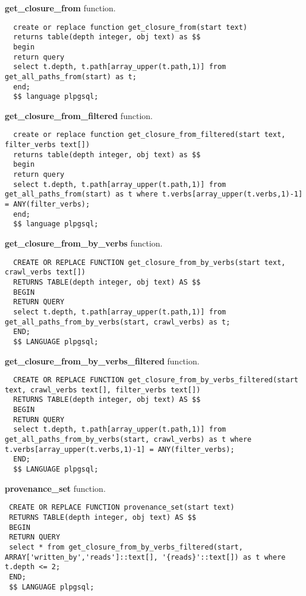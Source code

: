 \textbf{get\_closure\_from} function.

\begin{verbatim}
  create or replace function get_closure_from(start text)
  returns table(depth integer, obj text) as $$
  begin
  return query
  select t.depth, t.path[array_upper(t.path,1)] from get_all_paths_from(start) as t;
  end;
  $$ language plpgsql;
\end{verbatim}

\textbf{get\_closure\_from\_filtered} function.

\begin{verbatim}
  create or replace function get_closure_from_filtered(start text, filter_verbs text[])
  returns table(depth integer, obj text) as $$
  begin
  return query
  select t.depth, t.path[array_upper(t.path,1)] from get_all_paths_from(start) as t where t.verbs[array_upper(t.verbs,1)-1] = ANY(filter_verbs);
  end;
  $$ language plpgsql;
\end{verbatim}

\textbf{get\_closure\_from\_by\_verbs} function.

\begin{verbatim}
  CREATE OR REPLACE FUNCTION get_closure_from_by_verbs(start text, crawl_verbs text[])
  RETURNS TABLE(depth integer, obj text) AS $$
  BEGIN
  RETURN QUERY
  select t.depth, t.path[array_upper(t.path,1)] from get_all_paths_from_by_verbs(start, crawl_verbs) as t;
  END;
  $$ LANGUAGE plpgsql;
\end{verbatim}

\textbf{get\_closure\_from\_by\_verbs\_filtered} function.

\begin{verbatim}
  CREATE OR REPLACE FUNCTION get_closure_from_by_verbs_filtered(start text, crawl_verbs text[], filter_verbs text[])
  RETURNS TABLE(depth integer, obj text) AS $$
  BEGIN
  RETURN QUERY
  select t.depth, t.path[array_upper(t.path,1)] from get_all_paths_from_by_verbs(start, crawl_verbs) as t where t.verbs[array_upper(t.verbs,1)-1] = ANY(filter_verbs);
  END;
  $$ LANGUAGE plpgsql;
\end{verbatim}

\textbf{provenance\_set} function.

\begin{verbatim}
 CREATE OR REPLACE FUNCTION provenance_set(start text)
 RETURNS TABLE(depth integer, obj text) AS $$
 BEGIN
 RETURN QUERY
 select * from get_closure_from_by_verbs_filtered(start, ARRAY['written_by','reads']::text[], '{reads}'::text[]) as t where t.depth <= 2;
 END;
 $$ LANGUAGE plpgsql;
\end{verbatim}

